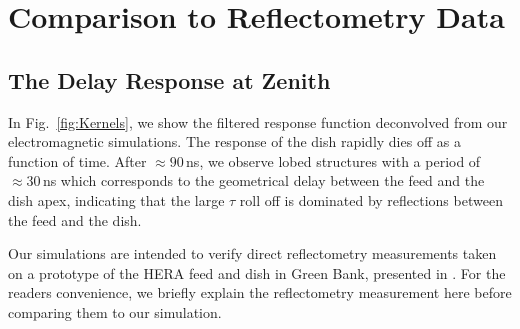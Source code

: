 \documentclass[twocolumn]{emulateapj}
\begin{document}


\section{Comparison to Reflectometry Data}\label{sec:Comparison}
\subsection{The Delay Response at Zenith}
In Fig.~\ref{fig:Kernels}, we show the filtered response function deconvolved from our electromagnetic simulations. The response of the dish rapidly dies off as a function of time. After $\approx90$\,ns, we observe lobed structures with a period of $\approx 30$\,ns which corresponds to the geometrical delay between the feed and the dish apex, indicating that the large $\tau$ roll off is dominated by reflections between the feed and the dish. 

Our simulations are intended to verify direct reflectometry measurements taken on a prototype of the HERA feed and dish in Green Bank, presented in \citep{Patra:2015}. For the readers convenience, we briefly explain the reflectometry measurement here before comparing them to our simulation.   
\end{document}
